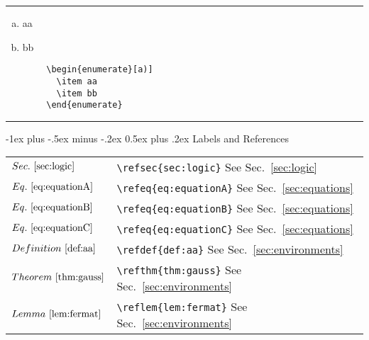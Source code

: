 \documentclass[a4paper,10pt,landscape]{article}
\makeatletter
\renewcommand{\section}{\@startsection{section}{1}{0mm}%
	                                {-1ex plus -.5ex minus -.2ex}%
	                                {0.5ex plus .2ex}%
	                                {\normalfont\large\bfseries}}
\newcommand{\hSep}{{\color{colorSep}\hrule}}
\theoremstyle{definition}
\theoremstyle{remark}
\newcommand{\reffig}[1]{Fig.~\ref{#1}}
\newcommand{\reftbl}[1]{Table~\ref{#1}}
\newcommand{\refsec}[1]{Sec.~\ref{#1}}
\newcommand{\refthm}[1]{Theorem~\ref{#1}}
\newcommand{\reflem}[1]{Lemma~\ref{#1}}
\newcommand{\refdef}[1]{Definition~\ref{#1}}
\newcommand{\refeq}[1]{Eq.~\ref{#1}}
\makeatother
\begin{document}
\begin{multicols}{3}
\begin{multicols}{2}
\begin{verbatim}
	\end{verbatim}
\end{multicols}
\hSep
\begin{multicols}{2}
		\begin{enumerate}[a)]
		  \item aa
		  \item bb
		\end{enumerate}
\columnbreak
	\begin{verbatim}
		\begin{enumerate}[a)]
		  \item aa
		  \item bb
		\end{enumerate}
	\end{verbatim}
\end{multicols}
\hSep




\section{Labels and References}


\begin{tabular}{@{}ll@{}}
	$\refsec{sec:logic}$	&\verb!\refsec{sec:logic}! See \refsec{sec:logic}\\
	$\refeq{eq:equationA}$	&\verb!\refeq{eq:equationA}! See \refsec{sec:equations}\\
	$\refeq{eq:equationB}$	&\verb!\refeq{eq:equationB}! See \refsec{sec:equations}\\
	$\refeq{eq:equationC}$	&\verb!\refeq{eq:equationC}! See \refsec{sec:equations}\\
	$\refdef{def:aa}$	&\verb!\refdef{def:aa}! See \refsec{sec:environments}\\
	$\refthm{thm:gauss}$	&\verb!\refthm{thm:gauss}! See \refsec{sec:environments}\\
	$\reflem{lem:fermat}$	&\verb!\reflem{lem:fermat}! See \refsec{sec:environments}\\
\end{tabular}




\end{multicols}
\end{document}
